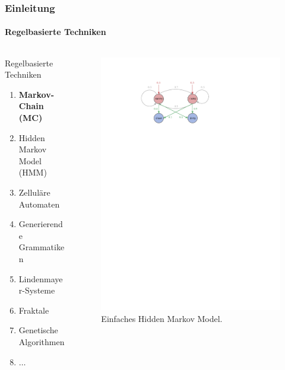 \documentclass[aspectratio=169]{beamer}
\begin{document}
\begin{frame}
\frametitle{Einleitung}
\framesubtitle{Regelbasierte Techniken}
\begin{columns}
	\begin{column}{0.5\textwidth}
		\begin{block}{Regelbasierte Techniken}
		\begin{enumerate}[label=$\bullet$]
			\item \textbf{Markov-Chain (MC)}
			\item Hidden Markov Model (HMM)
			\item Zelluläre Automaten
			\item Generierende Grammatiken
			\item Lindenmayer-Systeme
			\item Fraktale
			\item Genetische Algorithmen
			\item $\ldots$
		\end{enumerate}
	\end{block}
	\end{column}
	
	\begin{column}{0.5\textwidth}
		\begin{figure}
			\includegraphics[width=\textwidth]{hmm-example-prison}
			\caption{Einfaches Hidden Markov Model.}
		\end{figure}
	\end{column}
\end{columns}
\end{frame}
	
\end{document}
